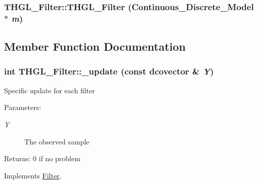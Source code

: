 \hypertarget{class_t_h_g_l___filter_cd237359274fb7e0e7a7f00570acd76a}{
\subsubsection[{THGL\_\-Filter}]{\setlength{\rightskip}{0pt plus 5cm}THGL\_\-Filter::THGL\_\-Filter ({\bf Continuous\_\-Discrete\_\-Model} $\ast$ {\em m})}}
\label{class_t_h_g_l___filter_cd237359274fb7e0e7a7f00570acd76a}




\subsection{Member Function Documentation}
\hypertarget{class_t_h_g_l___filter_2139ff41dc0eaa613847429c266ba7a5}{
\subsubsection[{\_\-update}]{\setlength{\rightskip}{0pt plus 5cm}int THGL\_\-Filter::\_\-update (const dcovector \& {\em Y})}}
\label{class_t_h_g_l___filter_2139ff41dc0eaa613847429c266ba7a5}


Specific update for each filter

\begin{Desc}
\item[Parameters:]
\begin{description}
\item[{\em Y}]The observed sample\end{description}
\end{Desc}
\begin{Desc}
\item[Returns:]0 if no problem \end{Desc}


Implements \hyperlink{class_filter_20ecd17fed3b8f11a76c960fe5e7144b}{Filter}.